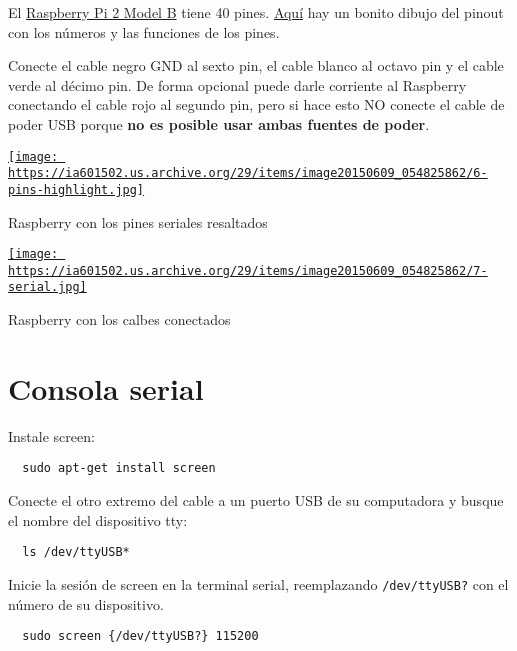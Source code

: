 \documentclass[12pt]{article}
\begin{document}
El \href{https://www.adafruit.com/products/2358}{Raspberry Pi 2 Model B} tiene
40 pines. \href{http://www.pighixxx.com/test/2015/06/raspberry-pi-v2-mod-b-pinout/#prettyPhoto[gallery1105]/0/}
{Aquí} hay un bonito dibujo del pinout con los números y las funciones de los
pines.

Conecte el cable negro GND al sexto pin, el cable blanco al octavo pin y el
cable verde al décimo pin. De forma opcional puede darle corriente al Raspberry
conectando el cable rojo al segundo pin, pero si hace esto NO conecte el cable
de poder USB porque \textbf{no es posible usar ambas fuentes de poder}.

\begin{center}
  \href{
    https://ia601502.us.archive.org/29/items/image20150609_054825862/6-pins-highlight.jpg}{
    \texttt{[image: 
      https://ia601502.us.archive.org/29/items/image20150609\_054825862/6-pins-highlight.jpg]}
  }
  \caption{Raspberry con los pines seriales resaltados}
\end{center}

\begin{center}
  \href{
    https://ia601502.us.archive.org/29/items/image20150609_054825862/7-serial.jpg}{
    \texttt{[image: 
      https://ia601502.us.archive.org/29/items/image20150609\_054825862/7-serial.jpg]}
  }
  \caption{Raspberry con los calbes conectados}
\end{center}

\section{Consola serial}

Instale screen:

\begin{verbatim}
  sudo apt-get install screen
\end{verbatim}

Conecte el otro extremo del cable a un puerto USB de su computadora y busque el
nombre del dispositivo tty:

\begin{verbatim}
  ls /dev/ttyUSB*
\end{verbatim}

Inicie la sesión de screen en la terminal serial, reemplazando
\verb$/dev/ttyUSB?$ con el número de su dispositivo.

\begin{verbatim}
  sudo screen {/dev/ttyUSB?} 115200
\end{verbatim}
\end{document}
